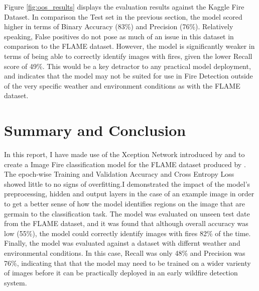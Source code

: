 \documentclass[a4paper,11pt]{article} %
\begin{document}
Figure \ref{fig:oos_results} displays the evaluation results against the Kaggle Fire Dataset. In comparison the Test set
in the previous section, the model scored higher in terms of Binary Accuracy (83\%) and Precision (76\%). Relatively speaking,
False positives do not pose as much of an issue in this dataset in comparison to the FLAME dataset. However, the model is significantly 
weaker in terms of being able to correctly identify images with fires, given the lower Recall score of 49\%. This would 
be a key detractor to any practical model deployment, and indicates that the model may not be suited for use in Fire Detection
outside of the very specific weather and environment conditions as with the FLAME dataset.

\section{Summary and Conclusion}
In this report, I have made use of the Xception Network introduced by  and  to create a 
Image Fire classification model for the FLAME dataset produced by . The epoch-wise Training and Validation Accuracy 
and Cross Entropy Loss showed little to no signs of overfitting.I demonstrated the impact of the model's preprocessing, hidden and output layers
in the case of an example image in order to get a better sense of how the model identifies regions on the image that are germain to the classification
task. The model was evaluated on unseen test date from the FLAME dataset, and it was found that although overall accuracy was low (55\%), the model
could correctly identify images with fires 82\% of the time. Finally, the model was evaluated against a dataset with differnt weather and environmental conditions.
In this case, Recall was only 48\% and Precision was 76\%, indicating that that the model may need to be trained on a wider varienty of
images before it can be practically deployed in an early wildfire detection system.

\printbibliography
\end{document}
